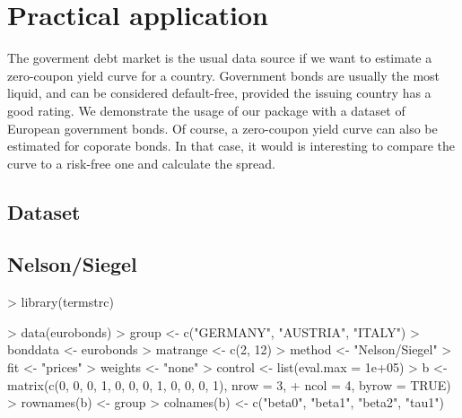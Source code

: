 \newpage
\section{Practical application}
\label{sec:pract-appl}

The goverment debt market is the usual data source if we want to estimate a zero-coupon yield curve for a country. Government bonds are usually the most liquid, and can be considered default-free, provided the issuing country has a good rating. We demonstrate the usage of our package with a dataset of European government bonds. Of course, a zero-coupon yield curve can also be estimated for coporate bonds. In that case, it would is interesting to compare the curve to a risk-free one and calculate the spread.

\subsection{Dataset}




\subsection{Nelson/Siegel}

\begin{Schunk}
\begin{Sinput}
> library(termstrc)
\end{Sinput}
\end{Schunk}

\begin{Schunk}
\begin{Sinput}
> data(eurobonds)
> group <- c("GERMANY", "AUSTRIA", "ITALY")
> bonddata <- eurobonds
> matrange <- c(2, 12)
> method <- "Nelson/Siegel"
> fit <- "prices"
> weights <- "none"
> control <- list(eval.max = 1e+05)
> b <- matrix(c(0, 0, 0, 1, 0, 0, 0, 1, 0, 0, 0, 1), nrow = 3, 
+     ncol = 4, byrow = TRUE)
> rownames(b) <- group
> colnames(b) <- c("beta0", "beta1", "beta2", "tau1")
\end{Sinput}
\end{Schunk}

